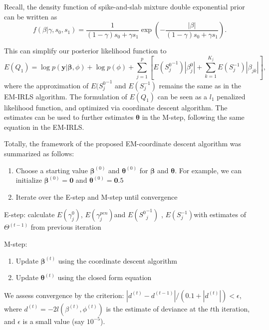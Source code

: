 \documentclass[AMA,STIX1COL,]{WileyNJD-v2}
\begin{document}
Recall, the density function of spike-and-slab mixture double
exponential prior can be written as \[
f(\beta|\gamma, s_0, s_1) = \frac{1}{(1-\gamma)s_0 + \gamma s_1}\exp(-\frac{|\beta|}{(1-\gamma)s_0 + \gamma s_1}).
\]

This can simplify our posterior likelihood function to \[
E(Q_1) = \log p(\textbf{y}|\boldsymbol{\beta}, \phi) + \log p(\phi) + \sum\limits_{j=1}^p\left[E({S^0_j}^{-1})|\beta^0_j|+\sum\limits_{k=1}^{K_j}E(S^{-1}_{j})|\beta_{jk}|\right]
,
\] where the approximation of \(E({S^0_j}^{-1}\) and \(E(S^{-1}_{j})\)
remains the same as in the EM-IRLS algorithm. The formulation of
\(E(Q_1)\) can be seen as a \(l_1\) penalized likelihood function, and
optimized via coordinate descent algorithm. The estimates can be used to
further estimates \(\boldsymbol{\theta}\) in the M-step, following the
same equation in the EM-IRLS.

Totally, the framework of the proposed EM-coordinate descent algorithm
was summarized as follows:

\begin{enumerate}
\def\labelenumi{\arabic{enumi})}
\item
  Choose a starting value \(\boldsymbol{\beta}^{(0)}\) and
  \(\boldsymbol{\theta}^{(0)}\) for \(\boldsymbol{\beta}\) and
  \(\boldsymbol{\theta}\). For example, we can initialize
  \(\boldsymbol{\beta}^{(0)} = \boldsymbol{0}\) and
  \(\boldsymbol{\theta}^{(0)} = \boldsymbol{0}.5\)
\item
  Iterate over the E-step and M-step until convergence
\end{enumerate}

E-step: calculate \(E(\gamma^0_{j})\), \(E(\gamma^{pen}_{j})\)and
\(E({S^0}^{-1}_{j})\) , \(E({S}^{-1}_{j})\)with estimates of
\(\Theta^{(t-1)}\) from previous iteration

M-step:

\begin{enumerate}
\def\labelenumi{\alph{enumi})}
\item
  Update \(\boldsymbol{\beta}^{(t)}\) using the coordinate descent
  algorithm
\item
  Update \(\boldsymbol{\theta}^{(t)}\) using the closed form equation
\end{enumerate}

We assess convergence by the criterion:
\(|d^{(t)}-d^{(t-1)}|/(0.1+|d^{(t)}|)<\epsilon\), where
\(d^{(t)} = -2l(\beta^{(t)},\phi^{(t)})\) is the estimate of deviance at
the \(t\)th iteration, and \(\epsilon\) is a small value (say
\(10^{-5}\)).
\end{document}
